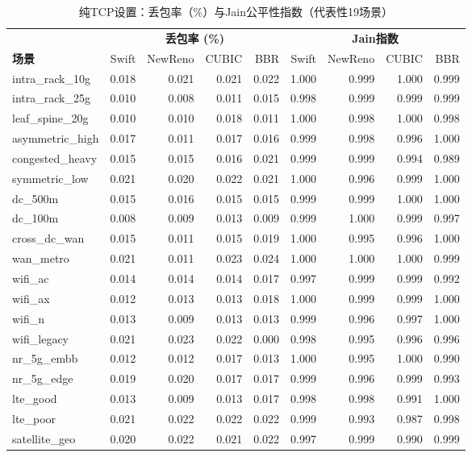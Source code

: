 \documentclass[10pt,twocolumn]{article}
\begin{document}
\begin{table}[htbp]
\centering
\caption{纯TCP设置：丢包率（\%）与Jain公平性指数（代表性19场景）}
\label{tab:loss}
\scriptsize
\setlength{\tabcolsep}{2.5pt}
\begin{tabular}{@{}lrrrr|rrrr@{}}
\toprule
& \multicolumn{4}{c}{\textbf{丢包率 (\%)}} & \multicolumn{4}{c}{\textbf{Jain指数}} \\
\textbf{场景} & Swift & NewReno & CUBIC & BBR & Swift & NewReno & CUBIC & BBR \\
\midrule
intra\_rack\_10g & 0.018 & 0.021 & 0.021 & 0.022 & 1.000 & 0.999 & 1.000 & 0.999 \\
intra\_rack\_25g & 0.010 & 0.008 & 0.011 & 0.015 & 0.998 & 0.999 & 0.999 & 0.999 \\
leaf\_spine\_20g & 0.010 & 0.010 & 0.018 & 0.011 & 1.000 & 0.998 & 1.000 & 0.998 \\
asymmetric\_high & 0.017 & 0.011 & 0.017 & 0.016 & 0.999 & 0.998 & 0.996 & 1.000 \\
congested\_heavy & 0.015 & 0.015 & 0.016 & 0.021 & 0.999 & 0.999 & 0.994 & 0.989 \\
symmetric\_low & 0.021 & 0.020 & 0.022 & 0.021 & 1.000 & 0.996 & 0.999 & 1.000 \\
dc\_500m & 0.015 & 0.016 & 0.015 & 0.015 & 0.999 & 0.999 & 1.000 & 1.000 \\
dc\_100m & 0.008 & 0.009 & 0.013 & 0.009 & 0.999 & 1.000 & 0.999 & 0.997 \\
cross\_dc\_wan & 0.015 & 0.011 & 0.015 & 0.019 & 1.000 & 0.995 & 0.996 & 1.000 \\
wan\_metro & 0.021 & 0.011 & 0.023 & 0.024 & 1.000 & 1.000 & 1.000 & 0.999 \\
wifi\_ac & 0.014 & 0.014 & 0.014 & 0.017 & 0.997 & 0.999 & 0.999 & 0.992 \\
wifi\_ax & 0.012 & 0.013 & 0.013 & 0.018 & 1.000 & 0.999 & 0.999 & 1.000 \\
wifi\_n & 0.013 & 0.009 & 0.013 & 0.013 & 0.999 & 0.996 & 0.997 & 1.000 \\
wifi\_legacy & 0.021 & 0.023 & 0.022 & 0.000 & 0.998 & 0.995 & 0.996 & 0.996 \\
nr\_5g\_embb & 0.012 & 0.012 & 0.017 & 0.013 & 1.000 & 0.995 & 1.000 & 0.990 \\
nr\_5g\_edge & 0.019 & 0.020 & 0.017 & 0.017 & 0.999 & 0.996 & 0.999 & 0.993 \\
lte\_good & 0.013 & 0.009 & 0.013 & 0.017 & 0.998 & 0.998 & 0.991 & 1.000 \\
lte\_poor & 0.021 & 0.022 & 0.022 & 0.022 & 0.999 & 0.993 & 0.987 & 0.998 \\
satellite\_geo & 0.020 & 0.022 & 0.021 & 0.022 & 0.997 & 0.999 & 0.990 & 0.999 \\
\bottomrule
\end{tabular}
\end{table}
\end{document}
